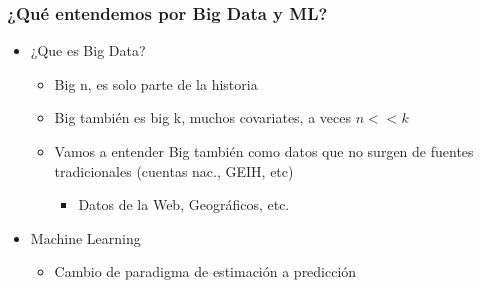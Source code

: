 \documentclass[
  shownotes,
  xcolor={svgnames},
  hyperref={colorlinks,citecolor=DarkBlue,linkcolor=andesred,urlcolor=DarkBlue}
  , aspectratio=169]{beamer}
\begin{document}
\begin{frame}
\frametitle{¿Qué entendemos por Big Data y ML?}

\begin{itemize}
      \item ¿Que es Big Data? 
      \medskip
      \begin{itemize}

      \item Big n, es solo parte de la historia
      \medskip
      \item Big también es big k, muchos covariates, a veces $n<<k$
      \medskip
      \item Vamos a entender Big también como datos que no surgen de fuentes tradicionales (cuentas nac., GEIH, etc)
      \medskip
      \begin{itemize}
        \item Datos de la Web, Geográficos, etc.

      \end{itemize}
      \end{itemize}
      \medskip
      \item Machine Learning
      \medskip
        \begin{itemize}

          \item Cambio de paradigma de estimación a predicción

        \end{itemize} 
      
\end{itemize}

\end{frame}
\end{document}
